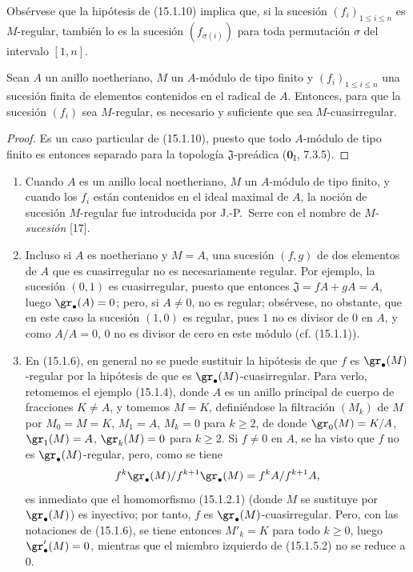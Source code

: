 Obsérvese que la hipótesis de (15.1.10) implica que, si la sucesión
$(f_i)_{1\leq i\leq n}$ es $M$-regular, también lo es la sucesión
$(f_{\sigma(i)})$ para toda permutación $\sigma$ del intervalo $[1,n]$.

\begin{corollary}[15.1.11]
\label{0.15.1.11-es}
Sean $A$ un anillo noetheriano, $M$ un $A$-módulo de tipo finito y
$(f_i)_{1\leq i\leq n}$ una sucesión finita de elementos contenidos en el
\textup{radical} de $A$. Entonces, para que la sucesión $(f_i)$ sea $M$-regular, es
necesario y suficiente que sea $M$-cuasirregular.
\end{corollary}

\begin{proof}
Es un caso particular de (15.1.10), puesto que todo $A$-módulo de tipo finito
es entonces separado para la topología $\mathfrak{J}$-preádica
($\mathbf{0}_{\mathrm I}$, 7.3.5).
\end{proof}

\begin{remarks}[15.1.12]
\label{0.15.1.12-es}
\mbox{}
\begin{enumerate}
  \item[(i)] Cuando $A$ es un anillo local noetheriano, $M$ un $A$-módulo de
  tipo finito, y cuando los $f_i$ están contenidos en el ideal maximal de $A$,
  la noción de sucesión $M$-regular fue introducida por J.-P.~Serre con el
  nombre de $M$-\emph{sucesión} [17].
  \item[(ii)] Incluso si $A$ es noetheriano y $M=A$, una sucesión $(f,g)$ de
  dos elementos de $A$ que es cuasirregular no es necesariamente regular. Por
  ejemplo, la sucesión $(0,1)$ es cuasirregular, puesto que entonces
  $\mathfrak{J}=fA+gA=A$, luego $\gr_\bullet(A)=0$; pero, si $A\neq0$, no es
  regular; obsérvese, no obstante, que en este caso la sucesión $(1,0)$ es
  regular, pues $1$ no es divisor de $0$ en $A$, y como $A/A=0$, $0$ no es
  divisor de cero en este módulo (cf. (15.1.1)).
  \item[(iii)]
  En (15.1.6), en general no se puede sustituir la hipótesis de que $f$ es
  $\gr_\bullet(M)$-regular por la hipótesis de que es
  $\gr_\bullet(M)$-cuasirregular. Para verlo, retomemos el ejemplo (15.1.4),
  donde $A$ es un anillo principal de cuerpo de fracciones $K\neq A$, y
  tomemos $M=K$, definiéndose la filtración $(M_k)$ de $M$ por
  $M_0=M=K$, $M_1=A$, $M_k=0$ para $k\geq2$, de donde
  $\gr_0(M)=K/A$, $\gr_1(M)=A$, $\gr_k(M)=0$ para $k\geq2$. Si $f\neq0$ en
  $A$, se ha visto que $f$ no es $\gr_\bullet(M)$-regular, pero, como se tiene
  \[
    f^k\gr_\bullet(M)/f^{k+1}\gr_\bullet(M)=f^kA/f^{k+1}A,
  \]
  es inmediato que el homomorfismo (15.1.2.1) (donde $M$ se sustituye por
  $\gr_\bullet(M)$) es inyectivo; por tanto, $f$ es
  $\gr_\bullet(M)$-cuasirregular. Pero, con las notaciones de (15.1.6), se
  tiene entonces $M'_k=K$ para todo $k\geq0$, luego
  $\gr'_\bullet(M)=0$, mientras que el miembro izquierdo de (15.1.5.2) no se
  reduce a $0$.
\end{enumerate}
\end{remarks}

